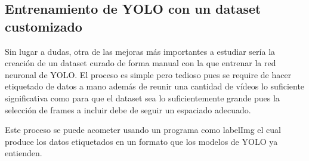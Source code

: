 \subsection{Entrenamiento de YOLO con un dataset customizado}
Sin lugar a dudas, otra de las mejoras más importantes a estudiar sería la creación de un dataset curado de forma manual con la que entrenar la red neuronal de YOLO. El proceso es simple pero tedioso pues se require de hacer etiquetado de datos a mano además de reunir una cantidad de vídeos lo suficiente significativa como para que el dataset sea lo suficientemente grande pues la selección de frames a incluir debe de seguir un espaciado adecuado.

Este proceso se puede acometer usando un programa como labelImg \cite{labelimg2024} el cual produce los datos etiquetados en un formato que los modelos de YOLO ya entienden.

